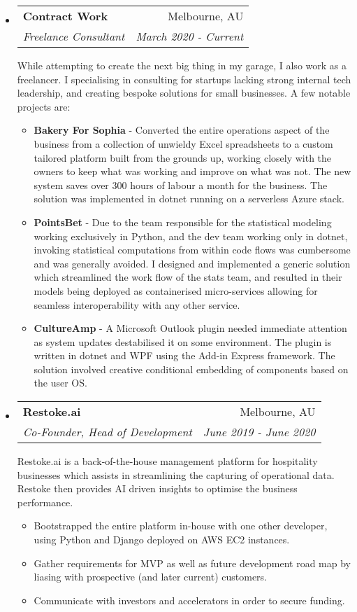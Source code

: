 \documentclass[letterpaper,11pt]{article}
\makeatletter
\newlength{\outerbordwidth}
\newcommand{\resitem}[1]{\item #1 \vspace{-2pt}}
\newcommand{\resheading}[1]{\vspace{-7pt}
  \parbox{\textwidth}{\setlength{\FrameSep}{\outerbordwidth}
    \begin{shaded}
\setlength{\fboxsep}{0pt}\framebox[\textwidth][l]{\setlength{\fboxsep}{4pt}\fcolorbox{shadecolorB}{shadecolorB}{\textbf{\sffamily{\mbox{~}\makebox[6.762in][l]{\large #1} \vphantom{p\^{E}}}}}}
    \end{shaded}
  }\vspace{-5pt}
}
\newcommand{\ressubheading}[4]{
\begin{tabular*}{6.5in}{l@{\cftdotfill{\cftsecdotsep}\extracolsep{\fill}}r}
		\textbf{#1} & #2 \\
		\textit{#3} & \textit{#4} \\
\end{tabular*}}
\makeatother
\begin{document}
\resheading{Employment History}
\begin{itemize}
\item[]
    \ressubheading{Contract Work}{Melbourne, AU}{Freelance Consultant}{March 2020 - Current}
    
    While attempting to create the next big thing in my garage, I also work as a freelancer. I specialising in consulting for startups lacking strong internal tech leadership, and creating bespoke solutions for small businesses.
    A few notable projects are:
    
    \begin{itemize}
        \resitem{\textbf{Bakery For Sophia} - Converted the entire operations aspect of the business from a collection of unwieldy Excel spreadsheets to a custom tailored platform built from the grounds up, working closely with the owners to keep what was working and improve on what was not. The new system saves over 300 hours of labour a month for the business. The solution was implemented in dotnet running on a serverless Azure stack.}
        \resitem{\textbf{PointsBet} - Due to the team responsible for the statistical modeling working exclusively in Python, and the dev team working only in dotnet, invoking statistical computations from within code flows was cumbersome and was generally avoided. I designed and implemented a generic solution which streamlined the work flow of the stats team, and resulted in their models being deployed as containerised micro-services allowing for seamless interoperability with any other service.}
        \resitem{\textbf{CultureAmp} - A Microsoft Outlook plugin needed immediate attention as system updates destabilised it on some environment. The plugin is written in dotnet and WPF using the Add-in Express framework. The solution involved creative conditional embedding of components based on the user OS.}
    \end{itemize}
    
\item[]
    \ressubheading{Restoke.ai}{Melbourne, AU}{Co-Founder, Head of Development}{June 2019 - June 2020}
    Restoke.ai is a back-of-the-house management platform for hospitality businesses which assists in streamlining the capturing of operational data. Restoke then provides AI driven insights to optimise the business performance.
    
    \begin{itemize}
        \resitem{Bootstrapped the entire platform in-house with one other developer, using Python and Django deployed on AWS EC2 instances.}
        \resitem{Gather requirements for MVP as well as future development road map by liasing with prospective (and later current) customers.}
        \resitem{Communicate with investors and accelerators in order to secure funding.}
    \end{itemize}
    

\end{itemize}
\end{document}
